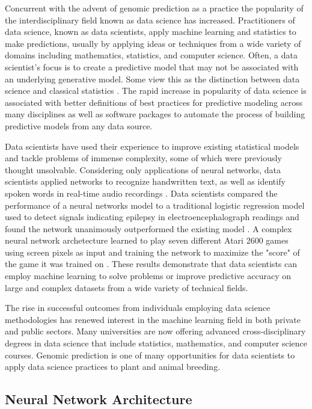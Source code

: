 Concurrent with the advent of genomic prediction as a practice the popularity of the 
interdisciplinary field known as data science has increased. Practitioners of data 
science, known as data scientists, apply machine learning and statistics to make 
predictions, usually by applying ideas or techniques from a wide variety of domains 
including mathematics, statistics, and computer science. Often, a data scientist's focus is to
create a predictive model that may not be associated with an underlying generative model. 
Some view this as the distinction between data science and classical statistics 
\citep{donoho2015, breiman2001}. The rapid increase in popularity of data science
is associated with better definitions of best practices for predictive modeling
across many disciplines as well as software packages to automate the 
process of building predictive models from any data source.

Data scientists have used their experience to improve existing statistical 
models and tackle problems of immense complexity, some of which were previously 
thought unsolvable. Considering only applications of neural networks, data scientists
applied networks to recognize handwritten text, as well as identify spoken 
words in real-time audio recordings \citep{lang1990}.
Data scientists compared the performance of a neural networks model to a traditional 
logistic regression model used to detect signals indicating epilepsy in electroencephalograph 
readings and found the network unanimously outperformed the existing model \citep{subasi2005}.
A complex neural network archetecture learned to play seven different Atari 2600 
games using screen pixels as input and training the network to maximize the "score" of
the game it was trained on \citep{mnih2013}. These results demonstrate that data scientists
can employ machine learning to solve problems or improve predictive accuracy on large and 
complex datasets from a wide variety of technical fields.

The rise in successful outcomes from individuals employing data science
methodologies has renewed interest in the machine learning field in both
private and public sectors. Many universities are now offering advanced cross-disciplinary
degrees in data science that include statistics, mathematics, and computer
science courses. Genomic prediction is one of many opportunities for data scientists
to apply data science practices to plant and animal breeding.

\subsection{Neural Network Architecture} \label{ssec:neuralnets}

